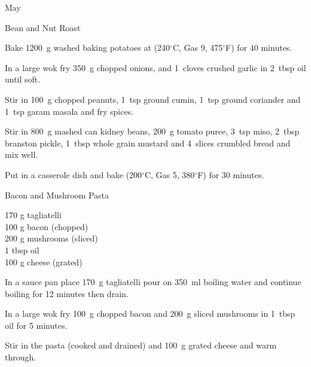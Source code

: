 \begin{menu}{May}
\begin{recipe}{2}{Bean and Nut Roast}
    \begin{instructions}
    \item 
    Bake
    1200~g washed baking potatoes
    at
    (240$^{\circ}$C, Gas 9, 475$^{\circ}$F) for 40 minutes.
  \item 
        In a large wok fry
        350~g chopped onions,
        and
        1~cloves crushed garlic
        in
        2~tbsp  oil
        until soft.
      \item 
        Stir in
        100~g chopped peanuts,
        1~tsp  ground cumin,
        1~tsp  ground coriander
        and
        1~tsp  garam masala
        and fry spices.
      \item 
        Stir in
        800~g mashed can kidney beans,
        200~g  tomato puree,
        3~tsp  miso,
        2~tbsp  branston pickle,
        1~tbsp  whole grain mustard
        and
        4~slices crumbled bread
        and mix well.
      \item 
        Put in a casserole dish and
        bake (200$^{\circ}$C, Gas 5, 380$^{\circ}$F) for 30 minutes.
      
    \end{instructions}
    \end{recipe}%
  
    \begin{recipe}{1}{Bacon and Mushroom Pasta}%
		\begin{ingredients}
		170 g tagliatelli  \\
	100 g bacon (chopped) \\
	200 g mushrooms (sliced) \\
	1 tbsp oil  \\
	100 g cheese (grated) \\
	
		\end{ingredients}
	
	
    \begin{instructions}
    \item 
    In a
    sauce pan
    place
    170~g  tagliatelli
    pour on
    350~ml  boiling water
    and continue boiling for 12 minutes then drain.
  \item 
        In a large wok fry 100~g chopped bacon
        and
        200~g sliced mushrooms
        in
        1~tbsp  oil for 5 minutes.
      \item 
        Stir in the pasta (cooked and drained)
        and 100~g grated cheese
        and warm through.
      

\end{instructions}
\end{recipe}
\end{menu}
